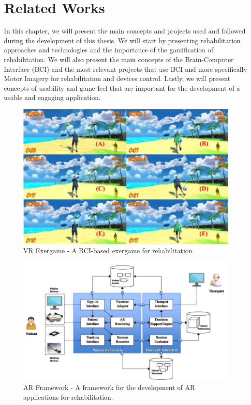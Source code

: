 \chapter{Related Works}\label{ch:related_works}
In this chapter, we will present the main concepts and projects used and followed during the development of this thesis. 
We will start by presenting rehabilitation approaches and technologies and the importance of the gamification of rehabilitation. 
We will also present the main concepts of the Brain-Computer Interface (BCI) and the most relevant projects that use BCI and more specifically Motor Imagery for rehabilitation and devices control.
Lastly, we will present concepts of usability and game feel that are important for the development of a usable and engaging application.

\begin{figure}[htbp!]
    \centering
    \includegraphics[width=\textwidth]{Figures/Related/ave_exergame}
    \caption{VR Exergame - A BCI-based exergame for rehabilitation. \cite{trombetta}}
\end{figure}

\begin{figure}[htbp!]
    \centering
    \includegraphics[width=\textwidth]{Figures/Related/ar_app_framework}
    \caption{AR Framework - A framework for the development of AR applications for rehabilitation. \cite{5567156}}
\end{figure}

